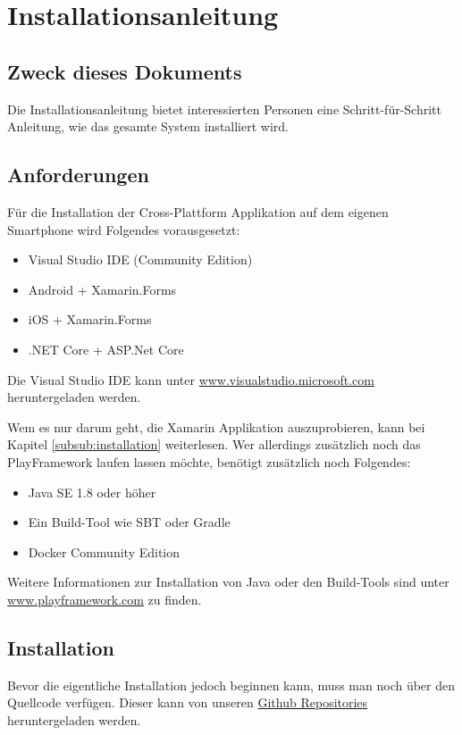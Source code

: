 \section{Installationsanleitung}

\subsection{Zweck dieses Dokuments}
Die Installationsanleitung bietet interessierten Personen eine Schritt-für-Schritt Anleitung, wie das gesamte System installiert wird.
 
\subsection{Anforderungen}
Für die Installation der Cross-Plattform Applikation auf dem eigenen Smartphone wird Folgendes vorausgesetzt:

\begin{itemize}
  \item Visual Studio IDE (Community Edition)
  \item Android + Xamarin.Forms
  \item iOS + Xamarin.Forms
  \item .NET Core + ASP.Net Core
\end{itemize}
Die Visual Studio IDE kann unter \href{https://visualstudio.microsoft.com/de/vs/}{www.visualstudio.microsoft.com} heruntergeladen werden. 

Wem es nur darum geht, die Xamarin Applikation auszuprobieren, kann bei Kapitel \ref{subsub:installation} weiterlesen. Wer allerdings zusätzlich noch das PlayFramework laufen lassen möchte, benötigt zusätzlich noch Folgendes:

\begin{itemize}
  \item Java SE 1.8 oder höher
  \item Ein Build-Tool wie SBT oder Gradle
  \item Docker Community Edition
\end{itemize}
Weitere Informationen zur Installation von Java oder den Build-Tools sind unter \href{https://www.playframework.com/documentation/2.6.x/Requirements}{www.playframework.com} zu finden.


\subsection{Installation}
Bevor die eigentliche Installation jedoch beginnen kann, muss man noch über den Quellcode verfügen. Dieser kann von unseren \href{https://github.com/BrainingOutOfBox}{Github Repositories} heruntergeladen werden.

